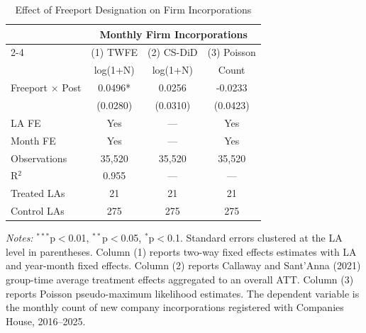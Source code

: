 \begin{table}[htbp]
\centering
\caption{Effect of Freeport Designation on Firm Incorporations}
\label{tab:main}
\begin{tabular}{lccc}
\hline\hline
 & \multicolumn{3}{c}{Monthly Firm Incorporations} \\
\cmidrule(lr){2-4}
 & (1) TWFE & (2) CS-DiD & (3) Poisson \\
 & log(1+N) & log(1+N) & Count \\
\hline
Freeport $\times$ Post & 0.0496* & 0.0256 & -0.0233 \\
 & (0.0280) & (0.0310) & (0.0423) \\
\hline
LA FE & Yes & --- & Yes \\
Month FE & Yes & --- & Yes \\
Observations & 35,520 & 35,520 & 35,520 \\
R$^2$ & 0.955 & --- & --- \\
Treated LAs & 21 & 21 & 21 \\
Control LAs & 275 & 275 & 275 \\
\hline\hline
\end{tabular}
\begin{tablenotes}[flushleft]
\small
\item \textit{Notes:} $^{***}$p$<$0.01, $^{**}$p$<$0.05, $^{*}$p$<$0.1. Standard errors clustered at the LA level in parentheses. Column (1) reports two-way fixed effects estimates with LA and year-month fixed effects. Column (2) reports Callaway and Sant'Anna (2021) group-time average treatment effects aggregated to an overall ATT. Column (3) reports Poisson pseudo-maximum likelihood estimates. The dependent variable is the monthly count of new company incorporations registered with Companies House, 2016--2025.
\end{tablenotes}
\end{table}
